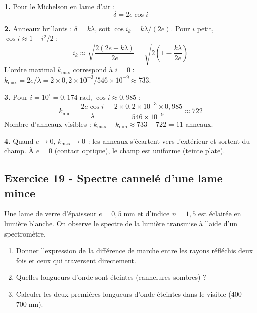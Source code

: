\documentclass[12pt,a4paper]{article}
\begin{document}
\begin{boitecorrige}
\textbf{1.} Pour le Michelson en lame d'air :
\[
\delta = 2e\cos i
\]

\textbf{2.} Anneaux brillants : $\delta = k\lambda$, soit $\cos i_k = k\lambda/(2e)$. Pour $i$ petit, $\cos i \approx 1 - i^2/2$ :
\[
i_k \approx \sqrt{\frac{2(2e - k\lambda)}{2e}} = \sqrt{2\left(1 - \frac{k\lambda}{2e}\right)}
\]
L'ordre maximal $k_\text{max}$ correspond à $i=0$ : $k_\text{max} = 2e/\lambda = 2\times 0{,}2\times10^{-3}/546\times10^{-9} \approx 733$.

\textbf{3.} Pour $i = 10^\circ = 0{,}174\;\text{rad}$, $\cos i \approx 0{,}985$ :
\[
k_\text{min} = \frac{2e\cos i}{\lambda} = \frac{2\times 0{,}2\times10^{-3}\times 0{,}985}{546\times10^{-9}} \approx 722
\]
Nombre d'anneaux visibles : $k_\text{max} - k_\text{min} \approx 733 - 722 = 11$ anneaux.

\textbf{4.} Quand $e \to 0$, $k_\text{max} \to 0$ : les anneaux s'écartent vers l'extérieur et sortent du champ. À $e = 0$ (contact optique), le champ est uniforme (teinte plate).
\end{boitecorrige}

\subsection*{Exercice 19 - Spectre cannelé d'une lame mince \niveau{\moyen}}

\begin{boiteexercice}
Une lame de verre d'épaisseur $e = 0{,}5\;\text{mm}$ et d'indice $n = 1{,}5$ est éclairée en lumière blanche. On observe le spectre de la lumière transmise à l'aide d'un spectromètre.
\begin{enumerate}
  \item Donner l'expression de la différence de marche entre les rayons réfléchis deux fois et ceux qui traversent directement.
  \item Quelles longueurs d'onde sont éteintes (cannelures sombres) ?
  \item Calculer les deux premières longueurs d'onde éteintes dans le visible ($400$-$700\;\text{nm}$).
\end{enumerate}
\end{boiteexercice}
\end{document}
